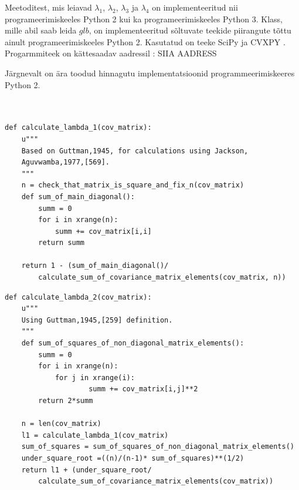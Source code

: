 \documentclass[a4paper,12pt,oneside]{article}
\newenvironment{customFloatWrap}{}{}
\numberwithin{equation}{section}
\theoremstyle{definition}
\begin{document}
Meetoditest, mis leiavad $\lambda_1$, $\lambda_2$, $\lambda_3$ ja $\lambda_4$ on implementeeritud nii programeerimiskeeles Python 2 kui ka programeerimiskeeles Python 3. Klass, mille abil saab leida $glb$, on implementeeritud sõltuvate teekide piirangute tõttu ainult programeerimiskeeles Python 2.  Kasutatud on teeke SciPy \cite{JonesE.;OliphantT;Peterson} ja CVXPY \cite{DiamondS;ChuE;Boyd2014}.
Progarmmiteek on kättesaadav aadressil : {\color{red} SIIA AADRESS}

Järgnevalt on ära toodud hinnagutu implementatsioonid programmeerimiskeeres Python 2.



\begin{customFloatWrap}
\begin{verbatim}


def calculate_lambda_1(cov_matrix):
    u""" 
    Based on Guttman,1945, for calculations using Jackson,
    Aguvwamba,1977,[569].
    """
    n = check_that_matrix_is_square_and_fix_n(cov_matrix)
    def sum_of_main_diagonal():
        summ = 0
        for i in xrange(n):
            summ += cov_matrix[i,i]
        return summ

    return 1 - (sum_of_main_diagonal()/
    	calculate_sum_of_covariance_matrix_elements(cov_matrix, n))

\end{verbatim}
\end{customFloatWrap}

\vspace{10pt}


\begin{customFloatWrap}
\begin{verbatim}
def calculate_lambda_2(cov_matrix):
    u"""
    Using Guttman,1945,[259] definition.
    """
    def sum_of_squares_of_non_diagonal_matrix_elements():
        summ = 0
        for i in xrange(n):
            for j in xrange(i):
                    summ += cov_matrix[i,j]**2 
        return 2*summ
    
    n = len(cov_matrix)
    l1 = calculate_lambda_1(cov_matrix)
    sum_of_squares = sum_of_squares_of_non_diagonal_matrix_elements()
    under_square_root =((n)/(n-1)* sum_of_squares)**(1/2)
    return l1 + (under_square_root/
        calculate_sum_of_covariance_matrix_elements(cov_matrix))
\end{verbatim}
\end{customFloatWrap}
\end{document}
